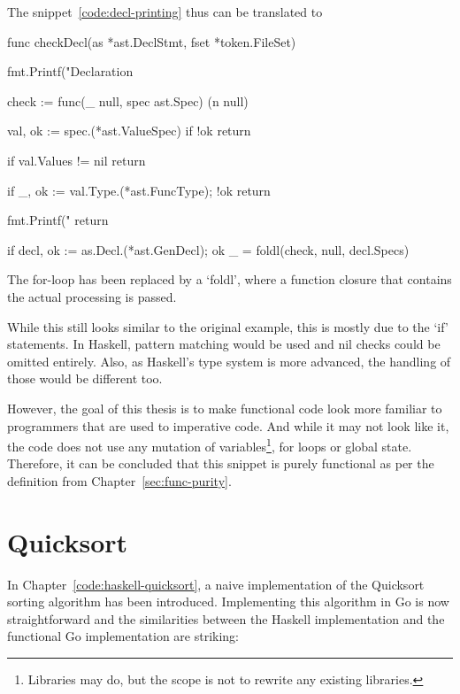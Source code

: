 The snippet~\ref{code:decl-printing} thus can be translated to

\begin{code}
	\begin{gocode}
func checkDecl(as *ast.DeclStmt, fset *token.FileSet) {
	fmt.Printf("Declaration %

	check := func(_ null, spec ast.Spec) (n null) {
		val, ok := spec.(*ast.ValueSpec)
		if !ok {
			return
		}

		if val.Values != nil {
			return
		}

		if _, ok := val.Type.(*ast.FuncType); !ok {
			return
		}

		fmt.Printf("\tIdent %
		return
	}

	if decl, ok := as.Decl.(*ast.GenDecl); ok {
		_ = foldl(check, null{}, decl.Specs)
	}
}
\end{gocode}
\end{code}
The for-loop has been replaced by a `foldl', where a function closure
that contains the actual processing is passed.

While this still looks similar to the original example, this is mostly due to
the `if' statements. In Haskell, pattern matching would be used and nil checks
could be omitted entirely. Also, as Haskell's type system is more advanced, the
handling of those would be different too.

However, the goal of this thesis is to make functional code look more familiar
to programmers that are used to imperative code.
And while it may not look like it, the code does not use any mutation of
variables\footnote{Libraries may do, but the scope is not to rewrite any existing
libraries.}, for loops or global state. Therefore, it can be concluded that this
snippet is purely functional as per the definition from Chapter~\ref{sec:func-purity}.

\section{Quicksort}

In Chapter~\ref{code:haskell-quicksort}, a naive implementation of the Quicksort sorting
algorithm has been introduced.
Implementing this algorithm in Go is now straightforward and the similarities between
the Haskell implementation and the functional Go implementation are striking:

